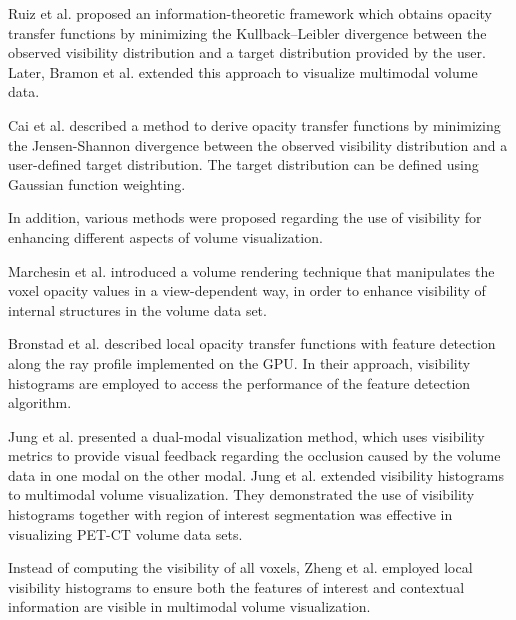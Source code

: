 Ruiz et al. \cite{ruiz_automatic_2011} proposed an information-theoretic framework which obtains opacity transfer functions by minimizing the Kullback–Leibler divergence between the observed visibility distribution and a target distribution provided by the user. Later, Bramon et al. \cite{bramon_information_2013} extended this approach to visualize multimodal volume data.

Cai et al. \cite{cai_automatic_2013} described a method to derive opacity transfer functions by minimizing the Jensen-Shannon divergence between the observed visibility distribution and a user-defined target distribution. The target distribution can be defined using Gaussian function weighting.





In addition, various methods were proposed regarding the use of visibility for enhancing different aspects of volume visualization.

Marchesin et al. \cite{marchesin_per-pixel_2010} introduced a volume rendering technique that manipulates the voxel opacity values in a view-dependent way, in order to enhance visibility of internal structures in the volume data set.

Bronstad et al. \cite{bronstad_visibility_2012} described local opacity transfer functions with feature detection along the ray profile implemented on the GPU. In their approach, visibility histograms are employed to access the performance of the feature detection algorithm.

Jung et al. \cite{jung_dual-modal_2012} presented a dual-modal visualization method, which uses visibility metrics to provide visual feedback regarding the occlusion caused by the volume data in one modal on the other modal.
Jung et al. \cite{jung_visibility-driven_2013} extended visibility histograms to multimodal volume visualization.
They demonstrated the use of visibility histograms together with region of interest segmentation was effective in visualizing PET-CT volume data sets.

Instead of computing the visibility of all voxels, Zheng et al. \cite{zheng_visibility_2013} employed local visibility histograms to ensure both the features of interest and contextual information are visible in multimodal volume visualization.

